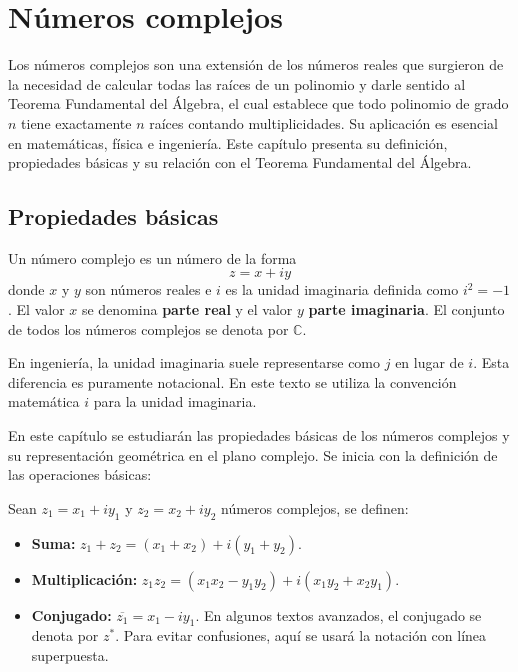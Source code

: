 \chapter{Números complejos}\label{numcomp}

Los números complejos son una extensión de los números reales que surgieron de la necesidad de calcular todas las raíces de un polinomio y darle sentido al Teorema Fundamental del Álgebra, el cual establece que todo polinomio de grado $n$ tiene exactamente $n$ raíces contando multiplicidades. Su aplicación es esencial en matemáticas, física e ingeniería. Este capítulo presenta su definición, propiedades básicas y su relación con el Teorema Fundamental del Álgebra.

\section{Propiedades básicas}

\begin{definition}
Un número complejo es un número de la forma $$z=x+iy$$ donde $x$ y $y$ son números reales e $i$ es la unidad imaginaria definida como $i^2=-1$. El valor $x$ se denomina \textbf{parte real} y el valor $y$ \textbf{parte imaginaria}. El conjunto de todos los números complejos se denota por $\mathbb{C}$.
\end{definition}

\begin{rem} 
En ingeniería, la unidad imaginaria suele representarse como $j$ en lugar de $i$. Esta diferencia es puramente notacional. En este texto se utiliza la convención matemática $i$ para la unidad imaginaria.
\end{rem}

En este capítulo se estudiarán las propiedades básicas de los números complejos y su representación geométrica en el plano complejo. Se inicia con la definición de las operaciones básicas:

\begin{definition}
Sean $z_1=x_1+iy_1$ y $z_2=x_2+iy_2$ números complejos, se definen:
\begin{itemize}
\item \textbf{Suma:} $z_1+z_2=\left( x_1+x_2 \right) + i\left( y_1+y_2 \right)$.
\item \textbf{Multiplicación:} $z_1z_2=\left(x_1x_2-y_1y_2\right)+i\left(x_1y_2+x_2y_1\right)$.
\item \textbf{Conjugado:} $\overline{z_1}= x_1-iy_1$. En algunos textos avanzados, el conjugado se denota por $z^{*}$. Para evitar confusiones, aquí se usará la notación con línea superpuesta.
\end{itemize} 
\end{definition}

